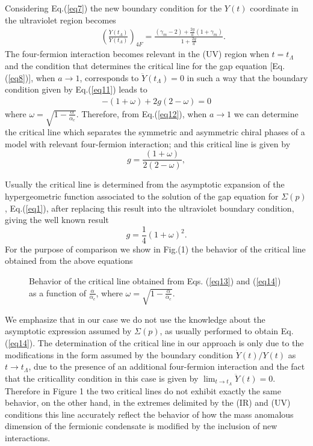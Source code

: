 \documentclass[preprint,amsmath,amssymb,superscriptaddress,showpacs,aps12pt]{revtex4}
\def\br{\begin{eqnarray}}
\def\er{\end{eqnarray}}
\def\be{\begin{equation}}
\def\ee{\end{equation}}
\begin{document}
\par Considering Eq.(\ref{eq7}) the new boundary condition for the $Y(t)$ coordinate in the ultraviolet region becomes
\br 
&& \left(\frac{\dot{Y}(t_{\Lambda})}{Y(t_{\Lambda})}\right)_{4F} = \frac{(\gamma_m -2) + \frac{2g}{a}(1+\gamma_m)}{1+\frac{2g}{a}}. 
\label{eq11} 
\er 
\noindent The four-fermion interaction becomes relevant in the (UV) region when  $t = t_{\Lambda}$ and  the condition that determines the critical line for the  gap equation [Eq.(\ref{eq8})], when $a\to 1$, corresponds to  $\ddot{Y}(t_{\Lambda}) = 0$ in such a way that the boundary condition given by Eq.(\ref{eq11}) leads to
\br 
-(1+\omega) + 2g(2 - \omega) = 0
\label{eq12}
\er
where $\omega =  \sqrt{1-\frac{\alpha}{\alpha_c}}$. Therefore, from Eq.(\ref{eq12}), when $a\to 1$ we can determine the critical line which separates the symmetric and asymmetric chiral phases of a model with relevant four-fermion interaction; and this critical line is given by 
\be 
 g = \frac{(1+\omega)}{2(2 - \omega)}  , 
\label{eq13}
\ee 
\par Usually the critical line is determined from the asymptotic expansion of the hypergeometric function associated to the solution of the gap equation for $\Sigma(p)$, Eq.(\ref{eq1}),  after replacing this result into the ultraviolet boundary condition,  
giving the well known result \cite{yama1, yama2, mira2, yama3, mira3, yama4}
\be 
g = \frac{1}{4}(1+\omega)^2 .
\label{eq14}
\ee 
\noindent For the purpose of comparison we show in Fig.(1) the behavior of the critical line obtained from the above equations 
\begin{figure}[!ht]
\begin{center}
\hspace*{2cm}
\vspace*{-4cm}
\caption{ Behavior of the critical line obtained from  Eqs. (\ref{eq13}) and (\ref{eq14})   as a function of $\frac{\alpha}{\alpha_c}$,
where $\omega=\sqrt{1-\frac{\alpha}{\alpha_c}}$.}
\end{center}
\end{figure}

\par We emphasize that in our case we do not use the knowledge about the asymptotic expression assumed by $\Sigma(p)$,  as usually
performed to obtain Eq. (\ref{eq14}). The determination of the critical line in our approach is only due to the modifications in the form assumed by the boundary condition $\dot{Y}(t)/Y(t)$ as $t \to t_{\Lambda}$, due to the  presence of an additional four-fermion
interaction and the fact that the criticallity condition in this case is given by $\lim_{t\rightarrow t_{\Lambda}} \ddot{Y}(t)=0$.
\noindent Therefore in Figure 1 the two critical lines do not exhibit exactly the same behavior, on the other hand, in the extremes
delimited  by the (IR) and (UV) conditions this line accurately reflect the behavior of how the  mass anomalous dimension of the fermionic condensate is modified by the inclusion of new interactions. 
\end{document}
